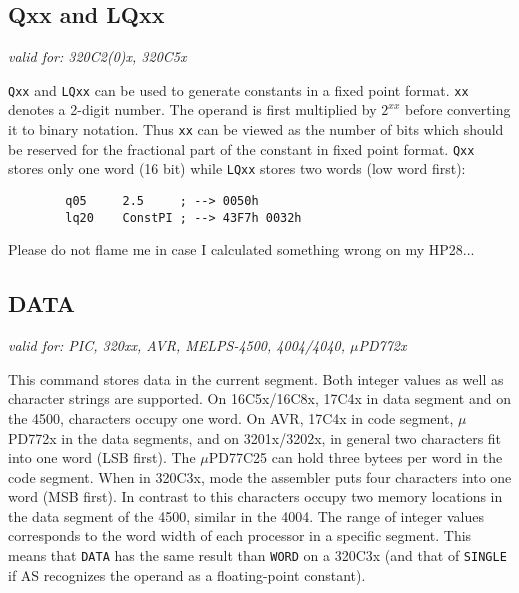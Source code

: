 \documentclass[12pt,twoside]{report}
\makeatletter
\newcommand{\tty}[1]{{\tt #1}}
\newcommand{\ttindex}[1]{\index{#1@{\tt #1}}}
\makeatother
\begin{document}

\subsection{Qxx and LQxx}
\ttindex{Qxx}\ttindex{LQxx}

{\em valid for: 320C2(0)x, 320C5x}

\tty{Qxx} and \tty{LQxx} can be used to generate constants in a fixed
point format. \tty{xx} denotes a 2-digit number.  The operand is first
multiplied by $2^{xx}$ before converting it to binary notation.  Thus
\tty{xx} can be viewed as the number of bits which should be reserved for
the fractional part of the constant in fixed point format.  \tty{Qxx}
stores only one word (16 bit) while \tty{LQxx} stores two words (low word
first):
\begin{verbatim}
        q05     2.5     ; --> 0050h
        lq20    ConstPI ; --> 43F7h 0032h
\end{verbatim}
Please do not flame me in case I calculated something wrong on my
HP28...


\subsection{DATA}
\ttindex{DATA}

{\em valid for: PIC, 320xx, AVR, MELPS-4500, 4004/4040, $\mu$PD772x}

This command stores data in the current segment.  Both integer values as
well as character strings are supported.  On 16C5x/16C8x, 17C4x in data
segment and on the 4500, characters occupy one word.  On AVR, 17C4x in
code segment, $\mu$PD772x in the data segments, and on 3201x/3202x, in
general two characters fit into one word (LSB first).  The $\mu$PD77C25
can hold three bytees per word in the code segment.  When in 320C3x, mode
the assembler puts four characters into one word (MSB first).  In contrast
to this characters occupy two memory locations in the data segment of the
4500, similar in the 4004.  The range of integer values corresponds to the
word width of each processor in a specific segment. This means that
\tty{DATA} has the same result than \tty{WORD} on a 320C3x (and that of
\tty{SINGLE} if AS recognizes the operand as a floating-point constant).

\end{document}
